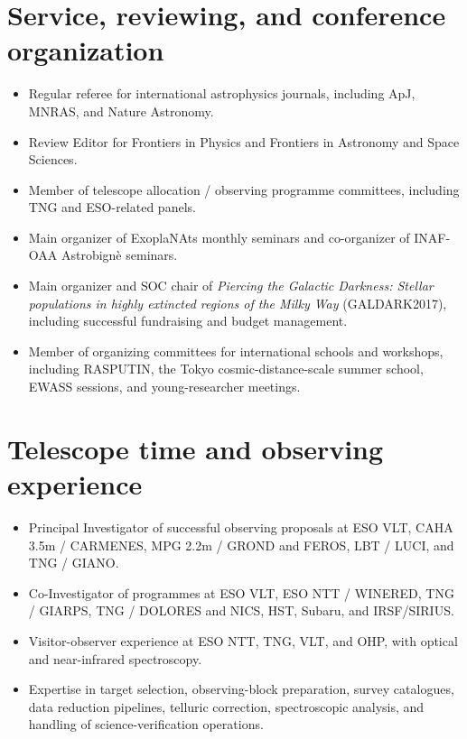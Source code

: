 \documentclass[11pt,a4paper]{article}
\begin{document}
\section*{Service, reviewing, and conference organization}
\begin{itemize}
    \item Regular referee for international astrophysics journals, including ApJ, MNRAS, and Nature Astronomy.
    \item Review Editor for Frontiers in Physics and Frontiers in Astronomy and Space Sciences.
    \item Member of telescope allocation / observing programme committees, including TNG and ESO-related panels.
    \item Main organizer of ExoplaNAts monthly seminars and co-organizer of INAF-OAA Astrobign\`e seminars.
    \item Main organizer and SOC chair of \textit{Piercing the Galactic Darkness: Stellar populations in highly extincted regions of the Milky Way} (GALDARK2017), including successful fundraising and budget management.
    \item Member of organizing committees for international schools and workshops, including RASPUTIN, the Tokyo cosmic-distance-scale summer school, EWASS sessions, and young-researcher meetings.
\end{itemize}

\section*{Telescope time and observing experience}
\begin{itemize}
    \item Principal Investigator of successful observing proposals at ESO VLT, CAHA 3.5m / CARMENES, MPG 2.2m / GROND and FEROS, LBT / LUCI, and TNG / GIANO.
    \item Co-Investigator of programmes at ESO VLT, ESO NTT / WINERED, TNG / GIARPS, TNG / DOLORES and NICS, HST, Subaru, and IRSF/SIRIUS.
    \item Visitor-observer experience at ESO NTT, TNG, VLT, and OHP, with optical and near-infrared spectroscopy.
    \item Expertise in target selection, observing-block preparation, survey catalogues, data reduction pipelines, telluric correction, spectroscopic analysis, and handling of science-verification operations.
\end{itemize}
\end{document}
